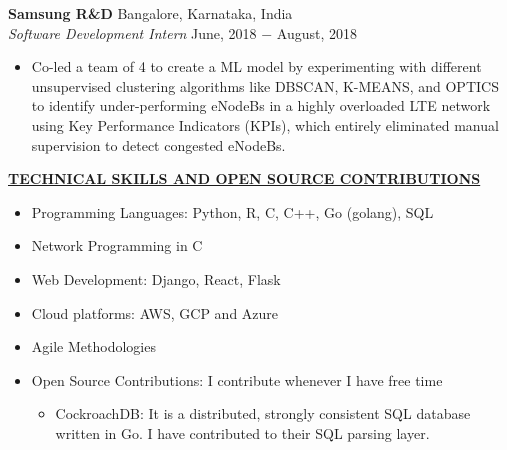 \documentclass{article}
\begin{document}
\noindent \textbf{Samsung R\&D} \hfill Bangalore, Karnataka, India \\
\textit{Software Development Intern} \hfill June, 2018 $-$ August, 2018
\begin{itemize}[noitemsep,nolistsep,leftmargin=*]
\item {Co-led a team of 4 to create a ML model by experimenting with different unsupervised clustering algorithms like DBSCAN, K-MEANS, and OPTICS to identify under-performing eNodeBs in a highly overloaded LTE network using Key Performance Indicators (KPIs), which entirely eliminated manual supervision to detect congested eNodeBs. \\}
\end{itemize}

\noindent \textbf{\underline{TECHNICAL SKILLS AND OPEN SOURCE CONTRIBUTIONS}}
\begin{itemize}[noitemsep,nolistsep,leftmargin=*]
\item {Programming Languages: Python, R, C, C++, Go (golang), SQL}
\item {Network Programming in C}
\item {Web Development: Django, React, Flask}
\item {Cloud platforms: AWS, GCP and Azure}
\item {Agile Methodologies}
\item {Open Source Contributions: I contribute whenever I have free time}
\begin{itemize}
    \item CockroachDB: It is a distributed, strongly consistent SQL database written in Go. I have contributed to their SQL parsing layer. \\
\end{itemize}
\end{itemize}

%
%
\end{document}

